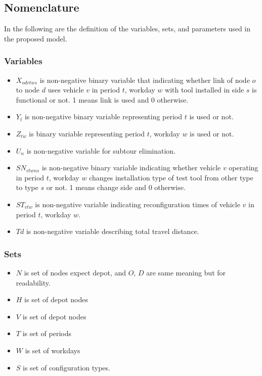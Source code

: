 \documentclass[numbered]{trbunofficial}
\begin{document}
\subsection{Nomenclature}
In the following are the definition of the variables, sets, and parameters used in the proposed model. 

\subsubsection{Variables}
\begin{itemize}
    \item $X_{odvtws}$ is non-negative binary variable that indicating whether link of node $o$ to node $d$ uses vehicle $v$ in period $t$, workday $w$ with tool installed in side $s$ is functional or not. 1 means link is used and 0 otherwise.
    \item $Y_t$ is non-negative binary variable representing period $t$ is used or not.
    \item $Z_{tw}$ is binary variable representing period $t$, workday $w$ is used or not. 
    \item $U_n$ is non-negative variable for subtour elimination.
    \item $SN_{vtwns}$ is non-negative binary variable indicating whether vehicle $v$ operating in period $t$, workday $w$ changes installation type of test tool from other type to type $s$ or not. 1 means change side and 0 otherwise.
    \item $ST_{vtw}$ is non-negative variable indicating reconfiguration times of vehicle $v$ in period $t$, workday $w$.
    \item $Td$ is non-negative variable describing total travel distance.
\end{itemize}

\subsubsection{Sets}
\begin{itemize}
    \item $N$ is set of nodes expect depot, and $O$, $D$ are same meaning but for readability.
    \item $H$ is set of depot nodes
    \item $V$ is set of depot nodes
    \item $T$ is set of periods
    \item $W$ is set of workdays
    \item $S$ is set of configuration types.
\end{itemize}
\end{document}
